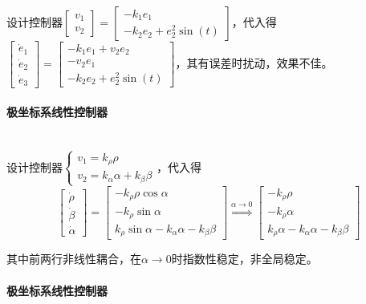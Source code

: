 \documentclass[
12pt, %
a4paper, 
oneside, %
headinclude,footinclude, %
]{scrartcl}
\begin{document}
设计控制器$ \begin{bmatrix} v_1 \\ v_2 \end{bmatrix} = \begin{bmatrix} -k_1 e_1 \\ -k_2 e_2 + e_2^2 \sin(t) \end{bmatrix} $，代入得$ \begin{bmatrix} \dot{e}_1 \\ \dot{e}_2 \\ \dot{e}_3 \end{bmatrix} = \begin{bmatrix} -k_1 e_1 + v_2 e_2 \\ -v_2 e_1 \\ -k_2 e_2 + e_2^2 \sin(t) \end{bmatrix} $，其有误差时扰动，效果不佳。
\paragraph{极坐标系线性控制器}~\\

设计控制器$ \begin{cases} v_1 = k_\rho \rho \\ v_2 = k_\alpha \alpha + k_\beta \beta \end{cases} $，代入得
$$ 
\begin{bmatrix} \dot{\rho} \\ \dot{\beta} \\ \dot{\alpha} \end{bmatrix} 
= \begin{bmatrix} -k_\rho \rho \cos\alpha \\ -k_\rho \sin\alpha \\ k_\rho \sin\alpha - k_\alpha \alpha - k_\beta \beta \end{bmatrix} 
\overset{\alpha \to 0}{\Longrightarrow}
\begin{bmatrix} -k_\rho \rho \\ -k_\rho \alpha \\ k_\rho \alpha - k_\alpha \alpha - k_\beta \beta \end{bmatrix} 
$$

其中前两行非线性耦合，在$ \alpha \to 0 $时指数性稳定，非全局稳定。
\paragraph{极坐标系线性控制器}~\\
\end{document}
